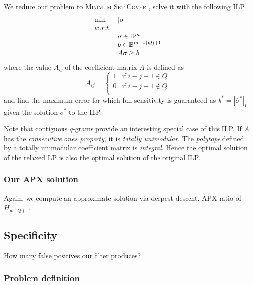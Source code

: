 We reduce our problem to \textsc{Minimum Set Cover} \citep{NemhauserWolsey99}, solve it with the following ILP
\begin{equation}
\begin{array}{ll}
\text{min} & |\sigma|_1	\\
w.r.t.				\\
& \sigma \in \mathbb {B}^m	\\
& b \in \mathbb {B}^{m-s(Q)+1}\\
& A\sigma \geq b	\\
\end{array}
\end{equation}
where the value $A_{ij}$ of the coefficient matrix $A$ is defined as
\begin{equation}
A_{ij} = 
\left\{
	\begin{array}{ll}
		1  & \mbox{if } i-j+1 \in Q		\\
		0  & \mbox{if } i-j+1 \notin Q	\\
	\end{array}
\right.
\end{equation}
and find the maximum error for which full-sensitivity is guaranteed as $k^* = |\bar{\sigma}^*|_1$ given the solution $\sigma^*$ to the ILP.

Note that contiguous $q$-grams provide an interesting special case of this ILP.
If $A$ has the \emph{consecutive ones property}, it is \emph{totally unimodular}.
The \emph{polytope} defined by a totally unimodular coefficient matrix is \emph{integral}.
Hence the optimal solution of the relaxed LP is also the optimal solution of the original ILP.


\subsubsection{Our APX solution}

Again, we compute an approximate solution via deepest descent.
APX-ratio of $H_{w(Q)}$ \citep{NemhauserWolsey99}.


\subsection{Specificity}

How many false positives our filter produces?

\subsubsection{Problem definition}

